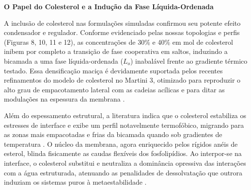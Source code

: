 \vspace{1em}
\noindent\textbf{O Papel do Colesterol e a Indução da Fase Líquida-Ordenada}

A inclusão de colesterol nas formulações simuladas confirmou seu potente efeito condensador e regulador. Conforme evidenciado pelas nossas topologias e perfis (Figuras 8, 10, 11 e 12), as concentrações de 30\% e 40\% em mol de colesterol inibem por completo a transição de fase cooperativa em saltos, induzindo a bicamada a uma fase líquida-ordenada ($L_o$) inabalável frente ao gradiente térmico testado. Essa densificação maciça é devidamente suportada pelos recentes refinamentos do modelo de colesterol no Martini 3, otimizado para reproduzir o alto grau de empacotamento lateral com as cadeias acílicas e para ditar as modulações na espessura da membrana \cite{borges2023}.

Além do espessamento estrutural, a literatura indica que o colesterol estabiliza os estresses de interface e exibe um perfil notavelmente termofóbico, migrando para as zonas mais empacotadas e frias da bicamada quando sob gradientes de temperatura \cite{deng2026}. O núcleo da membrana, agora enriquecido pelos rígidos anéis de esterol, blinda fisicamente as caudas flexíveis dos fosfolipídios. Ao interpor-se na interface, o colesterol substitui e neutraliza a dominância opressiva das interações com a água estruturada, atenuando as penalidades de dessolvatação que outrora induziam os sistemas puros à metaestabilidade \cite{borges2023, deng2026}.


 


\newpage %




